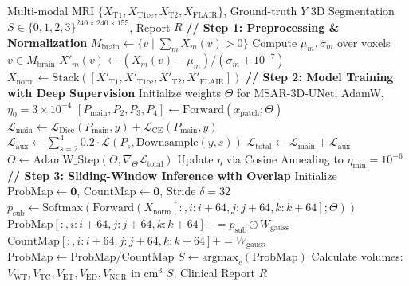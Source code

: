 \documentclass[conference]{IEEEtran}
\begin{document}
\begin{algorithm}[t]
\caption{MSAR-3D-UNet Training and Volumetric Inference}
\label{alg:training_inference}
\begin{algorithmic}[1]
\REQUIRE Multi-modal MRI $\{X_{\text{T1}}, X_{\text{T1ce}}, X_{\text{T2}}, X_{\text{FLAIR}}\}$, Ground-truth $Y$
\ENSURE 3D Segmentation $S \in \{0,1,2,3\}^{240\times 240\times 155}$, Report $R$
\STATE \textbf{// Step 1: Preprocessing \& Normalization}
\STATE $M_{\text{brain}} \leftarrow \{v \mid \sum_{m} X_m(v) > 0\}$
    \STATE Compute $\mu_m, \sigma_m$ over voxels $v \in M_{\text{brain}}$
    \STATE $X'_m(v) \leftarrow (X_m(v) - \mu_m) / (\sigma_m + 10^{-7})$
\ENDFOR
\STATE $X_{\text{norm}} \leftarrow \text{Stack}([X'_{\text{T1}}, X'_{\text{T1ce}}, X'_{\text{T2}}, X'_{\text{FLAIR}}])$
\STATE \textbf{// Step 2: Model Training with Deep Supervision}
\STATE Initialize weights $\Theta$ for MSAR-3D-UNet, AdamW, $\eta_0 = 3\times 10^{-4}$
        \STATE $[P_{\text{main}}, P_2, P_3, P_4] \leftarrow \text{Forward}(x_{\text{patch}}; \Theta)$
        \STATE $\mathcal{L}_{\text{main}} \leftarrow \mathcal{L}_{\text{Dice}}(P_{\text{main}}, y) + \mathcal{L}_{\text{CE}}(P_{\text{main}}, y)$
        \STATE $\mathcal{L}_{\text{aux}} \leftarrow \sum_{s=2}^4 0.2 \cdot \mathcal{L}(P_s, \text{Downsample}(y, s))$
        \STATE $\mathcal{L}_{\text{total}} \leftarrow \mathcal{L}_{\text{main}} + \mathcal{L}_{\text{aux}}$
        \STATE $\Theta \leftarrow \text{AdamW\_Step}(\Theta, \nabla_\Theta \mathcal{L}_{\text{total}})$
    \ENDFOR
    \STATE Update $\eta$ via Cosine Annealing to $\eta_{\text{min}} = 10^{-6}$
\ENDFOR
\STATE \textbf{// Step 3: Sliding-Window Inference with Overlap}
\STATE Initialize $\text{ProbMap} \leftarrow \mathbf{0}$, $\text{CountMap} \leftarrow \mathbf{0}$, Stride $\delta = 32$
    \STATE $p_{\text{sub}} \leftarrow \text{Softmax}(\text{Forward}(X_{\text{norm}}[:, i:i+64, j:j+64, k:k+64]; \Theta))$
    \STATE $\text{ProbMap}[:, i:i+64, j:j+64, k:k+64] += p_{\text{sub}} \odot W_{\text{gauss}}$
    \STATE $\text{CountMap}[:, i:i+64, j:j+64, k:k+64] += W_{\text{gauss}}$
\ENDFOR
\STATE $\text{ProbMap} \leftarrow \text{ProbMap} / \text{CountMap}$
\STATE $S \leftarrow \text{argmax}_c (\text{ProbMap})$
\STATE Calculate volumes: $V_{\text{WT}}, V_{\text{TC}}, V_{\text{ET}}, V_{\text{ED}}, V_{\text{NCR}}$ in cm$^3$
\RETURN $S$, Clinical Report $R$
\end{algorithmic}
\end{algorithm}
\end{document}
